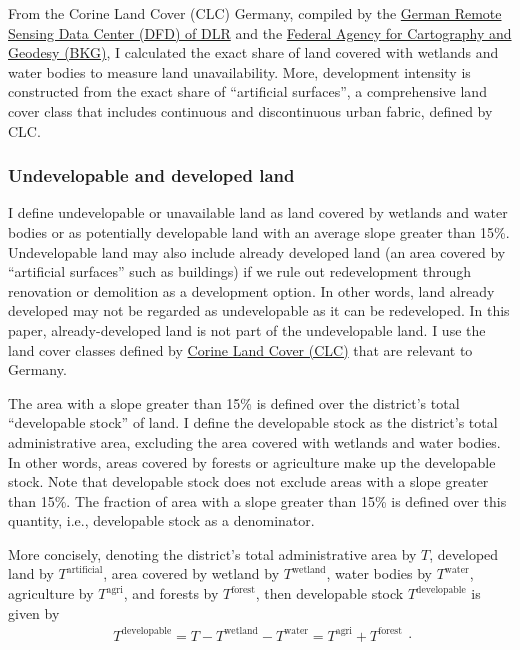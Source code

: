 \documentclass[
  12pt,
]{article}
\begin{document}
From the Corine Land Cover (CLC) Germany, compiled by the \href{https://www.dlr.de/eoc/en/desktopdefault.aspx/tabid-11882/20871_read-48836}{German Remote Sensing Data Center (DFD) of DLR} and the \href{https://www.bkg.bund.de}{Federal Agency for Cartography and Geodesy (BKG)}, I calculated the exact share of land covered with wetlands and water bodies to measure land unavailability. More, development intensity is constructed from the exact share of ``artificial surfaces'', a comprehensive land cover class that includes continuous and discontinuous urban fabric, defined by CLC.

\subsubsection{Undevelopable and developed land}\label{constraints}

I define undevelopable or unavailable land as land covered by wetlands and water bodies or as potentially developable land with an average slope greater than 15\%. Undevelopable land may also include already developed land (an area covered by ``artificial surfaces'' such as buildings) if we rule out redevelopment through renovation or demolition as a development option. In other words, land already developed may not be regarded as undevelopable as it can be redeveloped. In this paper, already-developed land is not part of the undevelopable land. I use the land cover classes defined by \href{https://land.copernicus.eu/user-corner/technical-library/corine-land-cover-nomenclature-guidelines/html/index.html}{Corine Land Cover (CLC)} that are relevant to Germany.

The area with a slope greater than 15\% is defined over the district's total ``developable stock'' of land. I define the developable stock as the district's total administrative area, excluding the area covered with wetlands and water bodies. In other words, areas covered by forests or agriculture make up the developable stock. Note that developable stock does not exclude areas with a slope greater than 15\%. The fraction of area with a slope greater than 15\% is defined over this quantity, i.e., developable stock as a denominator.

More concisely, denoting the district's total administrative area by \(T\), developed land by \(T^{\text{artificial}}\), area covered by wetland by \(T^{\text{wetland}}\), water bodies by \(T^{\text{water}}\), agriculture by \(T^{\text{agri}}\), and forests by \(T^{\text{forest}}\), then developable stock \(T^{\text{developable}}\) is given by \[
\begin{aligned}
T^{\text{developable}} = T - T^{\text{wetland}} - T^{\text{water}} = T^{\text{agri}}  + T^{\text{forest}}
\end{aligned}.
\]
\end{document}
